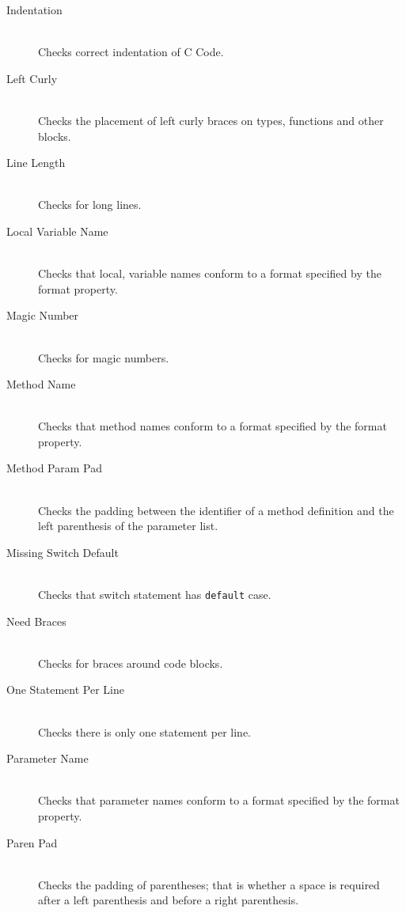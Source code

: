 \begin{description}
        \item[Indentation] \hfill \\
        Checks correct indentation of C Code.

        \item[Left Curly] \hfill \\
        Checks the placement of left curly braces on types, functions and other blocks. 

        \item[Line Length] \hfill \\
        Checks for long lines.


        \item[Local Variable Name]  \hfill \\
        Checks that local, variable names conform to a format specified by the format property.

        \item[Magic Number]  \hfill \\
        Checks for magic numbers.


        \item[Method Name] \hfill \\
        Checks that method names conform to a format specified by the format property.

        \item[Method Param Pad] \hfill \\
        Checks the padding between the identifier of a method definition and the left parenthesis of the parameter list.

        \item[Missing Switch Default] \hfill \\
        Checks that switch statement has \texttt{default} case.

        \item[Need Braces] \hfill \\
        Checks for braces around code blocks.

        \item[One Statement Per Line] \hfill \\
        Checks there is only one statement per line.

        \item[Parameter Name] \hfill \\
        Checks that parameter names conform to a format specified by the format property.

         \item[Paren Pad] \hfill \\
        Checks the padding of parentheses; that is whether a space is required after a 
        left parenthesis and before a right parenthesis.


\end{description}
